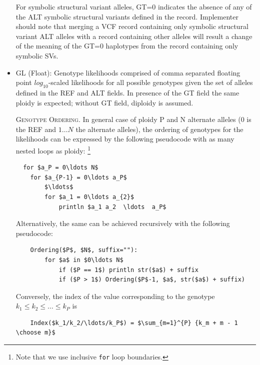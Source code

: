\documentclass[8pt]{article}
\begin{document}
\begin{itemize}
    For symbolic structural variant alleles, GT=0 indicates the absence of any of the ALT symbolic structural variants defined in the record.
    Implementer should note that merging a VCF record containing only symbolic structural variant ALT alleles with a record containing other alleles will result a change of the meaning of the GT=0 haplotypes from the record containing only symbolic SVs.

  \item GL (Float): Genotype likelihoods comprised of comma separated floating point $log_{10}$-scaled likelihoods for all possible genotypes given the set of alleles defined in the REF and ALT fields.
  In presence of the GT field the same ploidy is expected; without GT field, diploidy is assumed.

  \textsc{Genotype Ordering.} \label{genotype-fields:genotype-ordering}
  In general case of ploidy P and N alternate alleles (0 is the REF and $1\ldots N$ the alternate alleles), the ordering of genotypes for the likelihoods can be expressed by the following pseudocode with as many nested loops as ploidy:
  \footnote{Note that we use inclusive \texttt{for} loop boundaries.}
  \begingroup
  \small
  \begin{lstlisting}
  for $a_P = 0\ldots N$
    for $a_{P-1} = 0\ldots a_P$
        $\ldots$
        for $a_1 = 0\ldots a_{2}$
            println $a_1 a_2  \ldots  a_P$
  \end{lstlisting}
  \endgroup

  Alternatively, the same can be achieved recursively with the following pseudocode:
  \begingroup
  \small
  \begin{lstlisting}
    Ordering($P$, $N$, suffix=""):
        for $a$ in $0\ldots N$
            if ($P == 1$) println str($a$) + suffix
            if ($P > 1$) Ordering($P$-1, $a$, str($a$) + suffix)
  \end{lstlisting}
  \endgroup

  Conversely, the index of the value corresponding to the genotype $k_1\le k_2\le\ldots\le k_P$ is
  \begingroup
  \small
  \begin{lstlisting}
    Index($k_1/k_2/\ldots/k_P$) = $\sum_{m=1}^{P} {k_m + m - 1 \choose m}$
  \end{lstlisting}
  \endgroup


\end{itemize}
\end{document}
